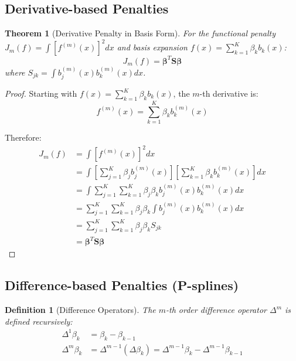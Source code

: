 \documentclass[12pt]{article}
\newtheorem{theorem}{Theorem}
\newtheorem{definition}{Definition}
\begin{document}
\subsection{Derivative-based Penalties}

\begin{theorem}[Derivative Penalty in Basis Form]
For the functional penalty $J_m(f) = \int [f^{(m)}(x)]^2 dx$ and basis expansion $f(x) = \sum_{k=1}^K \beta_k b_k(x)$:
\begin{equation}
J_m(f) = \bm{\beta}^T \mathbf{S} \bm{\beta}
\end{equation}
where $S_{jk} = \int b_j^{(m)}(x) b_k^{(m)}(x) dx$.
\end{theorem}

\begin{proof}
Starting with $f(x) = \sum_{k=1}^K \beta_k b_k(x)$, the $m$-th derivative is:
\begin{equation}
f^{(m)}(x) = \sum_{k=1}^K \beta_k b_k^{(m)}(x)
\end{equation}

Therefore:
\begin{align}
J_m(f) &= \int \left[f^{(m)}(x)\right]^2 dx \\
&= \int \left[\sum_{j=1}^K \beta_j b_j^{(m)}(x)\right] \left[\sum_{k=1}^K \beta_k b_k^{(m)}(x)\right] dx \\
&= \int \sum_{j=1}^K \sum_{k=1}^K \beta_j \beta_k b_j^{(m)}(x) b_k^{(m)}(x) dx \\
&= \sum_{j=1}^K \sum_{k=1}^K \beta_j \beta_k \int b_j^{(m)}(x) b_k^{(m)}(x) dx \\
&= \sum_{j=1}^K \sum_{k=1}^K \beta_j \beta_k S_{jk} \\
&= \bm{\beta}^T \mathbf{S} \bm{\beta}
\end{align}
\end{proof}

\subsection{Difference-based Penalties (P-splines)}

\begin{definition}[Difference Operators]
The $m$-th order difference operator $\Delta^m$ is defined recursively:
\begin{align}
\Delta^1 \beta_k &= \beta_k - \beta_{k-1} \\
\Delta^m \beta_k &= \Delta^{m-1}(\Delta \beta_k) = \Delta^{m-1} \beta_k - \Delta^{m-1} \beta_{k-1}
\end{align}
\end{definition}
\end{document}
